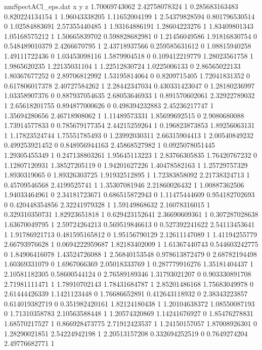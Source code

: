 \begin{filecontents}{nmSpectACl_eps.dat}
x y z
1.70069743062 2.42758078324 1
0.285683163483 0.820224134154 1
1.96043338205 1.11652004199 1
2.54379828594 0.801796530514 0
1.02584883691 2.57355440485 1
1.93164886191 1.28604223276 1
1.83409801343 1.05168575212 1
1.50665839702 0.598828682981 0
1.21456049586 1.91816830754 0
0.548489010379 2.4266670795 1
2.43718937566 0.259585631612 0
1.08815940258 1.49111722436 0
1.03453098116 1.5879904518 0
0.109412219779 1.28023561758 1
1.9865620235 1.22135031104 1
1.22512830724 1.0225006133 0
2.86565022133 1.80367677252 0
2.89706812992 1.53195814064 0
0.8209715405 1.72041831352 0
0.617806017378 2.40727584262 1
2.28442347034 0.430331423047 0
1.28180236997 1.03358907376 0
0.887937054635 2.68053646933 1
0.891570602061 2.32922789032 1
2.65618201755 0.894877000626 0
0.498394232883 2.45236217747 1
1.35694280656 2.46718908062 1
1.11489573331 1.85699692515 0
2.9080680088 1.73914577833 0
0.785679177354 2.44215259264 1
0.196823873853 1.89256063131 1
1.17823524744 1.75551785493 0
1.23992030311 2.66315904413 1
2.00540849232 0.499253921452 0
0.848956944163 2.45868527982 1
0.0925078051445 1.29305455349 1
0.247138803261 1.95645113223 1
2.83766305835 1.76420767232 0
1.12807120931 1.38527205119 0
1.94201627226 1.40478582163 1
1.25729757329 1.8930319065 0
1.89326303725 1.91932512895 1
1.72383858092 2.21738324713 1
0.45709546568 2.4199525741 1
1.35307081946 2.21860026432 1
1.00887362506 1.94033464961 0
2.34181723671 0.686515872943 0
1.11475444609 0.954182702693 0
0.420448354856 2.32241979328 1
1.59149868632 2.16078316015 1
0.329310350731 1.82923651818 1
0.629423152641 2.36690609361 1
0.307287028638 1.63670049795 1
2.59724264213 0.569519846613 0
0.527392241622 2.54113453641 1
1.91786921713 0.481595165812 0
1.95156790129 2.12611147089 1
1.41194255779 2.66793976628 1
0.0694222959687 1.82183402009 1
1.61367440743 0.544603242775 0
1.84906416078 1.43524726088 1
2.56840153548 0.978613872479 0
2.68782194498 1.60369331079 0
1.6967066369 2.05018333769 1
0.287779916276 1.35181404437 1
2.10581182305 0.58600544124 0
2.76589189346 1.31793021207 0
0.903330891708 2.71981111471 1
1.78910702143 1.78431684787 1
2.85201486168 1.75683049978 0
2.61444426339 1.1421123448 0
1.76686652891 0.412643118932 0
2.38343223857 0.614019382719 0
0.351982420161 1.82124180438 1
1.20104638372 1.08550087193 0
1.71310358783 2.10563588448 1
1.20574320869 1.14241676927 0
1.85476278831 1.68570217527 1
0.866928473775 2.71912423537 1
1.24150157057 1.87008926301 0
1.28290021851 2.54224942198 1
2.20513157208 0.332694252519 0
0.7649274204 2.49776682771 1

\end{filecontents}
